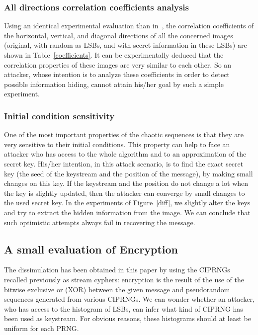 \subsubsection{All directions correlation coefficients analysis}

Using an identical experimental evaluation than in~\cite{Chen2004749}, the correlation coefficients of the horizontal, vertical, and diagonal directions of all the concerned images (original, with random as LSBs, and with secret information in these LSBs) are shown in Table~\ref{coefficients}.
It can be experimentally deduced that the correlation properties of these images are very similar to each other.
So an attacker, whose intention is to analyze
these coefficients in order to detect possible
information hiding, cannot attain his/her goal
by such a simple experiment.

\subsubsection{Initial condition sensitivity}

One of the most important properties of the chaotic sequences is that they are very sensitive to their initial conditions.
This property can help to face an attacker who
has access to the whole algorithm and to an
approximation of the secret key.
His/her intention, in this attack scenario, is
to find the exact secret key (the seed of the
keystream and the position of the message), by
making small changes on this key.
If the keystream and the position do not change
a lot when the key is slightly updated, then the
attacker can converge by small changes to the used secret key.
In the experiments of Figure~\ref{diff}, we slightly alter the keys and try to extract the hidden information from the image.
We can conclude that such optimistic attempts
always fail in recovering the message.



\subsection{A small evaluation of Encryption}

The dissimulation has been obtained in this paper by using the CIPRNGs recalled previously as stream
cyphers:  encryption is the result of the use of the bitwise exclusive or (XOR) between the given message and pseudorandom sequences generated from various CIPRNGs. We can wonder whether an attacker, who has access
to the histogram of LSBs, can infer what kind of CIPRNG has been used as keystream.
For obvious reasons, these histograms should at least be uniform for each PRNG.

